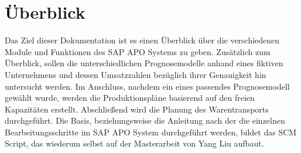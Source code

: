 \chapter{Überblick}
Das Ziel dieser Dokumentation ist es einen Überblick über die verschiedenen Module und Funktionen des SAP APO Systems zu geben. Zusätzlich zum Überblick, sollen die unterschiedlichen Prognosemodelle anhand eines fiktiven Unternehmens und dessen Umsatzzahlen bezüglich ihrer Genauigkeit hin untersucht werden. Im Anschluss, nachdem ein eines passendes Prognosemodell gewählt wurde, werden die Produktionspläne basierend auf den freien Kapazitäten erstellt. Abschließend wird die Planung des Warentransports durchgeführt.
Die Basis, beziehungsweise die Anleitung nach der die einzelnen Bearbeitungsschritte im SAP APO System durchgeführt werden, bildet das \ac{SCM} Script, das wiederum selbst auf der Masterarbeit von Yang Liu aufbaut. \cite{scm:script_17_1}

